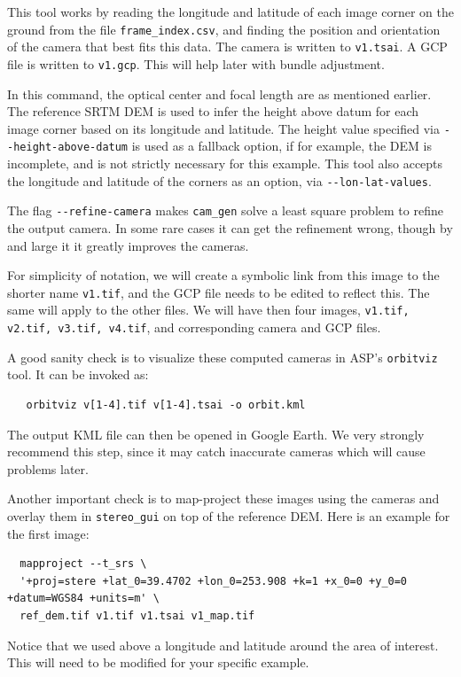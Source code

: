 This tool works by reading the longitude and latitude of each image corner on the ground 
from the file \texttt{frame\_index.csv}, and finding the position and orientation
of the camera that best fits this data. The camera is written to \texttt{v1.tsai}. 
A GCP file is written to \texttt{v1.gcp}. This will help later with bundle adjustment.

In this command, the optical center and focal length are as mentioned
earlier. The reference SRTM DEM is used to infer the height above datum
for each image corner based on its longitude and latitude. The height
value specified via \texttt{-\/-height-above-datum} is used as a
fallback option, if for example, the DEM is incomplete, and is not
strictly necessary for this example. This tool also accepts the
longitude and latitude of the corners as an option, via
\texttt{-\/-lon-lat-values}.

The flag \texttt{-\/-refine-camera} makes \texttt{cam\_gen} solve a least
square problem to refine the output camera. In some rare cases it can get the
refinement wrong, though by and large it it greatly improves the cameras.

For simplicity of notation, we will create a symbolic link from this image to
the shorter name \texttt{v1.tif}, and the GCP file needs to be edited to
reflect this. The same will apply to the other files. We will have then
four images, \texttt{v1.tif, v2.tif, v3.tif, v4.tif}, and corresponding
camera and GCP files.

A good sanity check is to visualize these computed cameras in ASP's
\texttt{orbitviz} tool. It can be invoked as:
\begin{verbatim}
   orbitviz v[1-4].tif v[1-4].tsai -o orbit.kml
\end{verbatim}

The output KML file can then be opened in Google Earth. We very strongly
recommend this step, since it may catch inaccurate cameras which will
cause problems later.

Another important check is to map-project these images using the cameras
and overlay them in \texttt{stereo\_gui} on top of the reference
DEM. Here is an example for the first image:
\begin{verbatim}
  mapproject --t_srs \
  '+proj=stere +lat_0=39.4702 +lon_0=253.908 +k=1 +x_0=0 +y_0=0 +datum=WGS84 +units=m' \
  ref_dem.tif v1.tif v1.tsai v1_map.tif 
\end{verbatim}

Notice that we used above a longitude and latitude around the area of interest. This 
will need to be modified for your specific example. 

